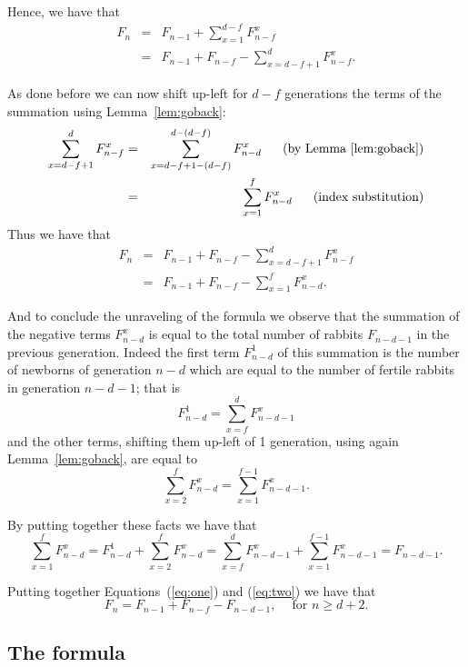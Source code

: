 \documentclass[11pt,epsf]{article}
\newcommand{\cfor}{{\text{ for }}}
\begin{document}
\noindent
Hence, we have that
\begin{eqnarray*}
F_n & = & F_{n-1}+\sum_{x=1}^{d-f} F_{n-f}^{x}\\
       & = & F_{n-1} + F_{n-f} - \sum_{x=d-f+1}^{d} F_{n-f}^x.
\end{eqnarray*}

As done before we can now shift up-left for $d-f$ generations the terms of the summation using Lemma~\ref{lem:goback}:
\begin{eqnarray*}
\sum_{x=d-f+1}^{d} F_{n-f}^x & = & \sum_{x=d-f+1-(d-f)}^{d-(d-f)} F_{n-d}^x\makebox{\ \ \ \ \ (by Lemma~\ref{lem:goback})}\\
					     & = & \sum_{x=1}^{f} F_{n-d}^x\makebox{\ \ \ \ \ (index substitution)}\\
\end{eqnarray*}
Thus we have that
\begin{eqnarray}
\nonumber
F_n  & = & F_{n-1} + F_{n-f} - \sum_{x=d-f+1}^{d} F_{n-f}^x\\
\label{eq:one}
        & = & F_{n-1} + F_{n-f} -\sum_{x=1}^{f} F_{n-d}^x.
\end{eqnarray}

And to conclude the unraveling of the formula we observe that the summation of the negative terms $F_{n-d}^x$
is equal to the total number of rabbits $F_{n-d-1}$ in the previous generation.
Indeed the first term $F_{n-d}^1$ of this summation is the number of newborns of generation $n-d$ which are equal
to the number of fertile rabbits in generation $n-d-1$; that is
$$F_{n-d}^1=\sum_{x=f}^d F_{n-d-1}^x$$
and the other terms, shifting them up-left of 1 generation, using again Lemma~\ref{lem:goback}, are equal to
$$\sum_{x=2}^{f} F_{n-d}^x = \sum_{x=1}^{f-1} F_{n-d-1}^x.$$

By putting together these facts we have that
\begin{equation}\label{eq:two}
\sum_{x=1}^{f} F_{n-d}^x = F_{n-d}^1+\sum_{x=2}^{f} F_{n-d}^x =
\sum_{x=f}^d F_{n-d-1}^x + \sum_{x=1}^{f-1} F_{n-d-1}^x = F_{n-d-1}.
\end{equation}

\bigskip
\noindent

Putting together Equations~(\ref{eq:one}) and (\ref{eq:two}) we have that
\begin{equation}\label{eq:case4}
F_n = F_{n-1}+F_{n-f}-F_{n-d-1}, \ \ \ \ \cfor n\ge d+2.
\end{equation}

\subsection{The formula}
\end{document}

